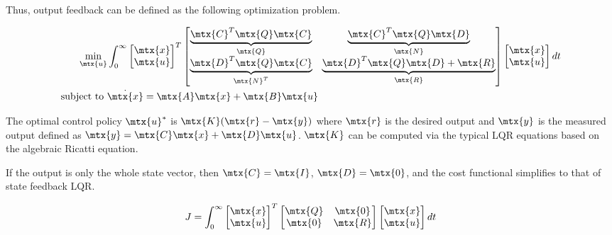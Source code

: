 Thus, output feedback can be defined as the following optimization problem.

\begin{theorem}
  \begin{align*}
    \min_{\mtx{u}} &\int_0^\infty
    \begin{bmatrix}
      \mtx{x} \\
      \mtx{u}
    \end{bmatrix}^T
    \begin{bmatrix}
      \underbrace{\mtx{C}^T\mtx{Q}\mtx{C}}_{\mtx{Q}} &
      \underbrace{\mtx{C}^T\mtx{Q}\mtx{D}}_{\mtx{N}} \\
      \underbrace{\mtx{D}^T\mtx{Q}\mtx{C}}_{\mtx{N}^T} &
      \underbrace{\mtx{D}^T\mtx{Q}\mtx{D} + \mtx{R}}_{\mtx{R}}
    \end{bmatrix}
    \begin{bmatrix}
      \mtx{x} \\
      \mtx{u}
    \end{bmatrix}
    dt \\
    \text{subject to } &\dot{\mtx{x}} = \mtx{A}\mtx{x} + \mtx{B}\mtx{u}
  \end{align*}

  The optimal control policy $\mtx{u}^*$ is $\mtx{K}(\mtx{r} - \mtx{y})$ where
  $\mtx{r}$ is the desired output and $\mtx{y}$ is the measured output defined
  as $\mtx{y} = \mtx{C}\mtx{x} + \mtx{D}\mtx{u}$. $\mtx{K}$ can be computed via
  the typical LQR equations based on the algebraic Ricatti equation.
\end{theorem}

If the output is only the whole state vector, then $\mtx{C} = \mtx{I}$,
$\mtx{D} = \mtx{0}$, and the cost functional simplifies to that of state
feedback LQR.

\begin{equation*}
  J = \int_0^\infty
  \begin{bmatrix}
    \mtx{x} \\
    \mtx{u}
  \end{bmatrix}^T
  \begin{bmatrix}
    \mtx{Q} & \mtx{0} \\
    \mtx{0} & \mtx{R}
  \end{bmatrix}
  \begin{bmatrix}
    \mtx{x} \\
    \mtx{u}
  \end{bmatrix}
  dt
\end{equation*}
